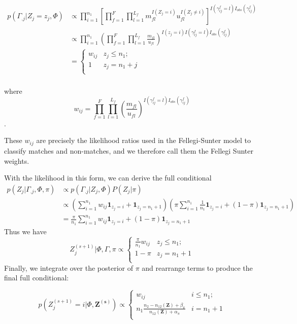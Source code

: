\documentclass[ba]{imsart}
\begin{document}
\begin{align*}
	p(\Gamma_{.j}|Z_j = z_j, \Phi) &\propto \prod_{i=1}^{n_1}\left[\prod_{f=1}^{F}\prod_{l=1}^{L_f} m_{fl}^{I(Z_j = i)}u_{fl}^{I(Z_j \neq i)}\right]^{I(\gamma_{ij}^f = l)I_{obs}(\gamma_{ij}^f)}\\
	&\propto \prod_{i=1}^{n_1}\left(\prod_{f=1}^{F}\prod_{l=1}^{L_f} \frac{m_{fl}}{u_{fl}}\right)^{I(z_j = i) I(\gamma_{ij}^f = l)I_{obs}(\gamma_{ij}^f)} \\
	&=
	\begin{cases} 
		w_{ij}  & z_j \leq n_1; \\
		1 &  z_j  = n_1 + j \\
	\end{cases}\\
\end{align*}

where
$$w_{ij} = \prod_{f=1}^{F}\prod_{l = 1}^{L_f} \left(\frac{m_{fl}}{u_{fl}}\right)^{I(\gamma_{ij}^f = l)I_{obs}(\gamma_{ij}^f)}$$. 

These \(w_{ij}\) are precisely the likelihood ratios used in the Fellegi-Sunter model to classify matches and non-matches, and we therefore call them the Fellegi Sunter weights.

With the likelihood in this form, we can derive the full conditional
\begin{align*}
	p(Z_j|\Gamma_{.j}, \Phi, \pi) &\propto p(\Gamma_{.j}| Z_j, \Phi) P(Z_j|\pi) \\
	&\propto \left(\sum_{i=1}^{n_1}w_{ij}\bm{1}_{z_j = i} + \bm{1}_{z_j = n_1 + 1}\right)\left(\pi\sum_{i=1}^{n_1}\frac{1}{n_1}\bm{1}_{z_j = i} + (1-\pi)\bm{1}_{z_j = n_1 + 1}\right) \\	
	&= \frac{\pi}{n_1}\sum_{i=1}^{n_1}w_{ij}\bm{1}_{z_j = i} + (1-\pi)\bm{1}_{z_j = n_1 + 1}
\end{align*}
Thus we have
$$Z_j^{(s+1)} | \Phi, \Gamma, \pi \propto \begin{cases} 
	\frac{\pi}{n_1}w_{ij}   & z_j \leq n_1; \\
	1-\pi &  z_j  = n_1 + 1 \\
\end{cases}$$
Finally, we integrate over the posterior of \(\pi\) and rearrange terms to produce the final full conditional:

\[p\left(Z_j^{(s+1)}  = i| \Phi, \bm{Z^{(s)}}\right) \propto
\begin{cases} 
	w_{ij}  & i \leq n_1; \\
	n_1 \frac{n_2 - n_{12}(\bm{Z}) + \beta_{\pi}}{n_{12}(\bm{Z}) + \alpha_{\pi}} & i  = n_1 + 1 \\
\end{cases}\]
\end{document}
